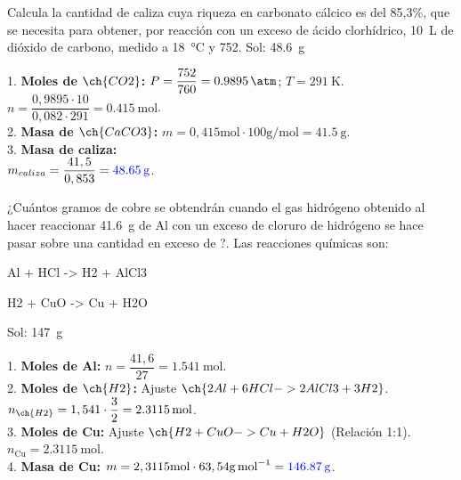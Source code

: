 \begin{exercise}
    Calcula la cantidad de caliza cuya riqueza en carbonato cálcico es del 85,3\%, que se necesita para obtener, por reacción con un exceso de ácido clorhídrico, \qty{10}{\L} de dióxido de carbono, medido a \qty{18}{\celsius} y \qty{752}{\mmhg}. Sol: \qty{48.6}{\g}
    \begin{solu}
        1. \textbf{Moles de \( \ch{CO2} \):} \( P = \dfrac{752}{760} = \qty{0,9895}{\atm} \); \( T = \qty{291}{\K} \). \\
        \( n = \dfrac{0,9895 \cdot 10}{0,082 \cdot 291} = \qty{0,415}{\mol} \). \\
        2. \textbf{Masa de \( \ch{CaCO3} \):} \( m = 0,415 \si{\mol} \cdot 100 \si{\g\per\mol} = \qty{41,5}{\g} \). \\
        3. \textbf{Masa de caliza:} \\
        \( m_{caliza} = \dfrac{41,5}{0,853} = \textbf{\textcolor{blue}{\qty{48,65}{\g}}} \).
    \end{solu}
\end{exercise}

\begin{exercise}
    ¿Cuántos gramos de cobre se obtendrán cuando el gas hidrógeno obtenido al hacer reaccionar \qty{41.6}{\g} de Al con un exceso de cloruro de hidrógeno se hace pasar sobre una cantidad en exceso de ?. Las reacciones químicas son:
    \begin{reaction*}
        Al + HCl -> H2 + AlCl3
    \end{reaction*}
    \begin{reaction*}
        H2 + CuO -> Cu + H2O
    \end{reaction*}
    Sol: \qty{147}{\g}

    \begin{solu}
        1. \textbf{Moles de Al:} \( n = \dfrac{41,6}{27} = \qty{1,541}{\mol} \). \\
        2. \textbf{Moles de \( \ch{H2} \):} Ajuste \( \ch{2 Al + 6 HCl -> 2 AlCl3 + 3 H2} \). \\
        \( n_{\ch{H2}} = 1,541 \cdot \dfrac{3}{2} = \qty{2,3115}{\mol} \). \\
        3. \textbf{Moles de Cu:} Ajuste \( \ch{H2 + CuO -> Cu + H2O} \) (Relación 1:1). \\
        \( n_{\text{Cu}} = \qty{2,3115}{\mol} \). \\
        4. \textbf{Masa de Cu:} \( m = 2,3115 \si{\mol} \cdot 63,54 \si{\g\per\mol} = \textbf{\textcolor{blue}{\qty{146,87}{\g}}} \).
    \end{solu}

\end{exercise}

